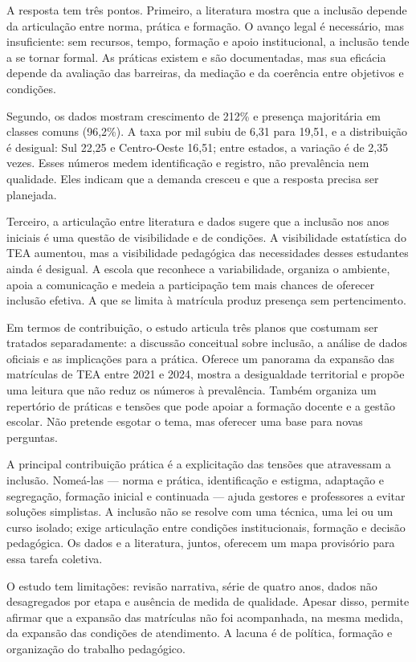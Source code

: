 A resposta tem três pontos. Primeiro, a literatura mostra que a inclusão
depende da articulação entre norma, prática e formação. O avanço legal é
necessário, mas insuficiente: sem recursos, tempo, formação e apoio
institucional, a inclusão tende a se tornar formal. As práticas existem
e são documentadas, mas sua eficácia depende da avaliação das barreiras,
da mediação e da coerência entre objetivos e condições.

Segundo, os dados mostram crescimento de 212\% e presença majoritária em
classes comuns (96,2\%). A taxa por mil subiu de 6,31 para 19,51, e a
distribuição é desigual: Sul 22,25 e Centro-Oeste 16,51; entre estados,
a variação é de 2,35 vezes. Esses números medem identificação e
registro, não prevalência nem qualidade. Eles indicam que a demanda
cresceu e que a resposta precisa ser planejada.

Terceiro, a articulação entre literatura e dados sugere que a inclusão
nos anos iniciais é uma questão de visibilidade e de condições. A
visibilidade estatística do TEA aumentou, mas a visibilidade pedagógica
das necessidades desses estudantes ainda é desigual. A escola que
reconhece a variabilidade, organiza o ambiente, apoia a comunicação e
medeia a participação tem mais chances de oferecer inclusão efetiva. A
que se limita à matrícula produz presença sem pertencimento.

Em termos de contribuição, o estudo articula três planos que costumam
ser tratados separadamente: a discussão conceitual sobre inclusão, a
análise de dados oficiais e as implicações para a prática. Oferece um
panorama da expansão das matrículas de TEA entre 2021 e 2024, mostra a
desigualdade territorial e propõe uma leitura que não reduz os números à
prevalência. Também organiza um repertório de práticas e tensões que
pode apoiar a formação docente e a gestão escolar. Não pretende esgotar
o tema, mas oferecer uma base para novas perguntas.

A principal contribuição prática é a explicitação das tensões que
atravessam a inclusão. Nomeá-las --- norma e prática, identificação e
estigma, adaptação e segregação, formação inicial e continuada --- ajuda
gestores e professores a evitar soluções simplistas. A inclusão não se
resolve com uma técnica, uma lei ou um curso isolado; exige articulação
entre condições institucionais, formação e decisão pedagógica. Os dados
e a literatura, juntos, oferecem um mapa provisório para essa tarefa
coletiva.

O estudo tem limitações: revisão narrativa, série de quatro anos, dados
não desagregados por etapa e ausência de medida de qualidade. Apesar
disso, permite afirmar que a expansão das matrículas não foi
acompanhada, na mesma medida, da expansão das condições de atendimento.
A lacuna é de política, formação e organização do trabalho pedagógico.

